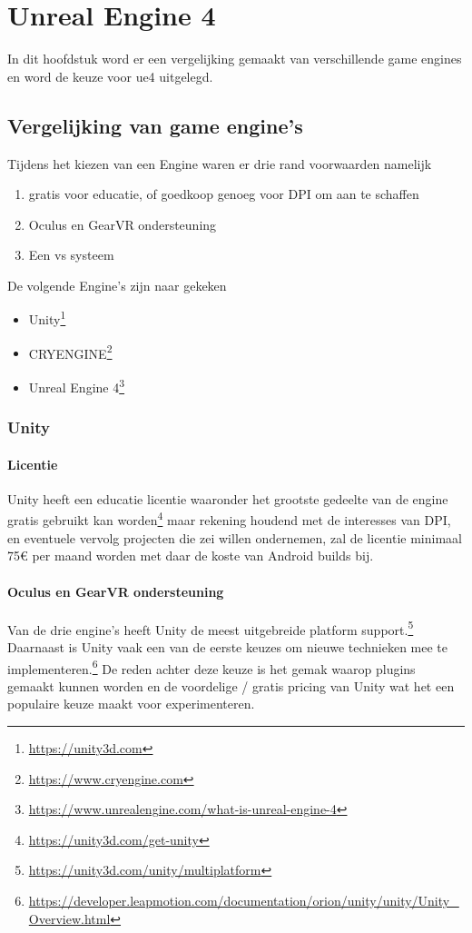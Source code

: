 \chapter{Unreal Engine 4}

In dit hoofdstuk word er een vergelijking gemaakt van verschillende game engines en word de keuze voor \gls{ue4} uitgelegd.

\section{Vergelijking van game engine's}

Tijdens het kiezen van een Engine waren er drie rand voorwaarden namelijk 
\begin{enumerate}
	\item gratis voor educatie, of goedkoop genoeg voor DPI om aan te schaffen
	\item Oculus en GearVR ondersteuning
	\item Een \gls{vs} systeem
\end{enumerate}

De volgende Engine’s zijn naar gekeken 
\begin{itemize}
\item Unity\footnote{\url{https://unity3d.com}}
\item CRYENGINE\footnote{\url{https://www.cryengine.com}}
\item Unreal Engine 4\footnote{\url{https://www.unrealengine.com/what-is-unreal-engine-4}}
\end{itemize}

\subsection{Unity}

\subsubsection{Licentie}
Unity heeft een educatie licentie waaronder het grootste gedeelte van de engine gratis gebruikt kan worden\footnote{\url{https://unity3d.com/get-unity}} maar rekening houdend met de interesses van DPI, en eventuele vervolg projecten die zei willen ondernemen, zal de licentie minimaal 75€ per maand worden met daar de koste van Android builds bij.

\subsubsection{Oculus en GearVR ondersteuning}
Van de drie engine’s heeft Unity de meest uitgebreide platform support.\footnote{\url{https://unity3d.com/unity/multiplatform}} Daarnaast is Unity vaak een van de eerste keuzes om nieuwe technieken mee te implementeren.\footnote{\url{https://developer.leapmotion.com/documentation/orion/unity/unity/Unity_Overview.html}} De reden achter deze keuze is het gemak waarop plugins gemaakt kunnen worden en de voordelige / gratis pricing van Unity wat het een populaire keuze maakt voor experimenteren.

